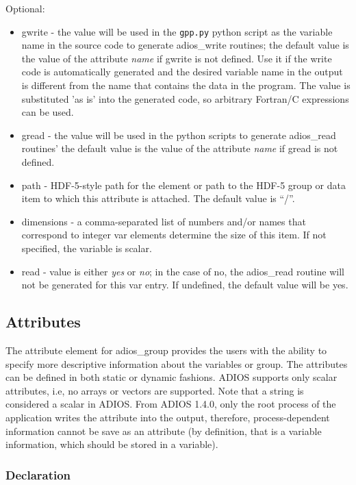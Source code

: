 Optional: 
\begin{itemize}
\item gwrite - the value will be used in the \verb+gpp.py+ python script as the 
variable name in the source code to generate adios\_write 
routines; the default value is the value of the attribute \textit{name} if gwrite 
is not defined. Use it if the write code is automatically generated and the desired
variable name in the output is different from the name that contains the data in the
program. The value is substituted 'as is' into the generated code, so arbitrary
Fortran/C expressions can be used. 
\item gread - the value will be used in the python scripts to generate adios\_read routines' 
the default value is the value of the attribute \textit{name} if  gread is not 
defined.
\item path - HDF-5-style path for the element or path to the HDF-5 group or data item 
to which this attribute is attached.  The default value is ``/''.
\item dimensions - a comma-separated list of numbers and/or names that correspond to 
integer var elements determine the size of this item. If not specified, the variable 
is scalar.
\item read - value is either \textit{yes} or \textit{no}; in the case of no, the adios\_read 
routine will not be generated for this var entry. If undefined, the default value 
will be yes. 
\end{itemize}

\subsection{Attributes}
The attribute element for adios\_group provides the users with the ability to specify 
more descriptive information about the variables or group. The attributes can be 
defined in both static or dynamic fashions. ADIOS supports only scalar attributes, i.e, 
no arrays or vectors are supported. Note that a string is considered a scalar in ADIOS. 
From ADIOS 1.4.0, only the root process of the application writes the attribute into 
the output, therefore, process-dependent information cannot be save as an attribute 
(by definition, that is a variable information, which should be stored in a variable).

\subsubsection{Declaration}

